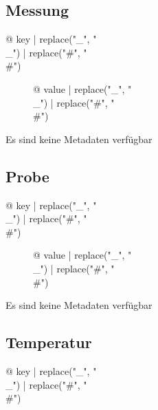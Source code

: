 \begin{multicols}{2}

\subsection{Messung}

\begin{description}
\item[{@ key | replace("_", "\\_") | replace("#", "\\#") }] {@ value | replace("_", "\\_") | replace("#", "\\#") }
\end{description}
Es sind keine Metadaten verfügbar

\subsection{Probe}

\begin{description}
\item[{@ key | replace("_", "\\_") | replace("#", "\\#") }] {@ value | replace("_", "\\_") | replace("#", "\\#") }
\end{description}
Es sind keine Metadaten verfügbar

\subsection{Temperatur}

\begin{description}
\item[{@ key | replace("_", "\\_") | replace("#", "\\#") }] %
\end{description}


\end{multicols}
